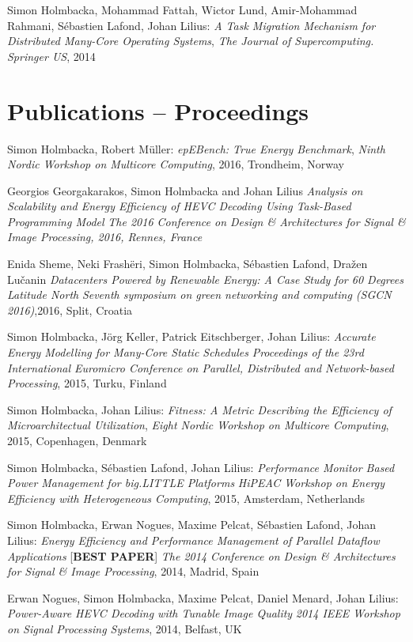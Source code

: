 \documentclass[margin,line]{resume}
\begin{document}
\begin{resume}
Simon Holmbacka, Mohammad Fattah, Wictor Lund, Amir-Mohammad Rahmani, S\'{e}bastien Lafond, Johan Lilius:
\textit{A Task Migration Mechanism for Distributed Many-Core Operating Systems}, 
\textsl{The Journal of Supercomputing. Springer US}, 2014 


\section{\mysidestyle Publications -- Proceedings}
Simon Holmbacka, Robert M\"{u}ller: 
\textit{epEBench: True Energy Benchmark},
\textsl{Ninth Nordic Workshop on Multicore Computing}, 2016, Trondheim, Norway

Georgios Georgakarakos, Simon Holmbacka and Johan Lilius
\textit{Analysis on Scalability and Energy Efficiency of HEVC Decoding Using Task-Based Programming Model}
\textsl{The 2016 Conference on Design \& Architectures for Signal \& Image Processing, 2016, Rennes, France}

Enida Sheme, Neki Frash\"{e}ri, Simon Holmbacka, S\'{e}bastien Lafond, Dra\v{z}en Lu\v{c}anin 
\textit{Datacenters Powered by Renewable Energy: A Case Study for 60 Degrees Latitude North}
\textsl{Seventh symposium on green networking and computing (SGCN 2016)},2016, Split, Croatia

Simon Holmbacka, J\"{o}rg Keller, Patrick Eitschberger, Johan Lilius:
\textit{Accurate Energy Modelling for Many-Core Static Schedules}
\textsl{Proceedings of the 23rd International Euromicro Conference on Parallel, Distributed and Network-based Processing}, 2015, Turku, Finland

Simon Holmbacka, Johan Lilius: 
\textit{Fitness: A Metric Describing the Efficiency of Microarchitectual Utilization},
\textsl{Eight Nordic Workshop on Multicore Computing}, 2015, Copenhagen, Denmark

Simon Holmbacka, S\'{e}bastien Lafond, Johan Lilius:
\textit{Performance Monitor Based Power Management for big.LITTLE Platforms}
\textsl{HiPEAC Workshop on Energy Efficiency with Heterogeneous Computing}, 2015, Amsterdam, Netherlands

Simon Holmbacka, Erwan Nogues, Maxime Pelcat, S\'{e}bastien Lafond, Johan Lilius:
\textit{Energy Efficiency and Performance Management of Parallel Dataflow Applications} [\textbf{BEST PAPER}]
\textsl{The 2014 Conference on Design \& Architectures for Signal \& Image Processing}, 2014, Madrid, Spain

Erwan Nogues, Simon Holmbacka, Maxime Pelcat, Daniel Menard, Johan Lilius:
\textit{Power-Aware HEVC Decoding with Tunable Image Quality}
\textsl{2014 IEEE Workshop on Signal Processing Systems}, 2014, Belfast, UK
\clearpage


\end{resume}
\end{document}
